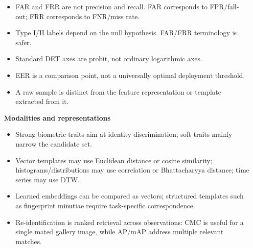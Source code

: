 \documentclass[11pt,a4paper,oneside]{report}
\begin{document}
\noindent\begin{minipage}[t]{0.485\textwidth}
\vspace{0pt}
\raggedright
\begin{remarkbox}
\begin{itemize}[leftmargin=*,itemsep=0.18em,topsep=0.25em]
    \item FAR and FRR are not precision and recall. FAR corresponds to FPR/fall-out; FRR corresponds to FNR/miss rate.
    \item Type I/II labels depend on the null hypothesis. FAR/FRR terminology is safer.
    \item Standard DET axes are probit, not ordinary logarithmic axes.
    \item EER is a comparison point, not a universally optimal deployment threshold.
    \item A raw sample is distinct from the feature representation or template extracted from it.
\end{itemize}
\end{remarkbox}

\end{minipage}\hfill
\begin{minipage}[t]{0.485\textwidth}
\vspace{0pt}
\raggedright
\begin{keyconcept}
\textbf{Modalities and representations}
\begin{itemize}[leftmargin=*,itemsep=0.18em,topsep=0.25em]
    \item Strong biometric traits aim at identity discrimination; soft traits mainly narrow the candidate set.
    \item Vector templates may use Euclidean distance or cosine similarity; histograms/\allowbreak distributions may use correlation or Bhattacharyya distance; time series may use DTW.
    \item Learned embeddings can be compared as vectors; structured templates such as fingerprint minutiae require task-specific correspondence.
    \item Re-identification is ranked retrieval across observations: CMC is useful for a single mated gallery image, while AP/mAP address multiple relevant matches.
\end{itemize}
\end{keyconcept}
\end{minipage}\par
\end{document}
